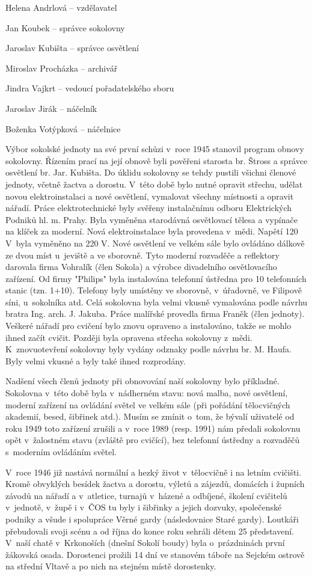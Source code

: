 \documentclass[a5paper, 12pt, twoside]{article}
\begin{document}
Helena Andrlová -- vzdělavatel

Jan Koubek -- správce sokolovny

Jaroslav Kubišta -- správce osvětlení

Miroslav Procházka -- archivář

Jindra Vajkrt -- vedoucí pořadatelského sboru

Jaroslav Jirák -- náčelník

Boženka Votýpková -- náčelnice

Výbor sokolské jednoty na své první schůzi v~roce 1945 stanovil program
obnovy sokolovny. Řízením prací na její obnově byli pověřeni starosta
br. Štross a správce osvětlení br. Jar. Kubišta. Do úklidu sokolovny se
tehdy pustili všichni členové jednoty, včetně žactva a dorostu. V~této
době bylo nutné opravit střechu, udělat novou elektroinstalaci a nové
osvětlení, vymalovat všechny místnosti a opravit nářadí. Práce
elektrotechnické byly svěřeny instalačnímu odboru Elektrických Podniků
hl. m. Prahy. Byla vyměněna starodávná osvětlovací tělesa a vypínače na
klíček za moderní. Nová elektroinstalace byla provedena v~mědi. Napětí
120 V~byla vyměněno na 220 V. Nové osvětlení ve velkém sále bylo
ovládáno dálkově ze dvou míst u~jeviště a ve sborovně. Tyto moderní
rozvaděče a reflektory darovala firma Vohralík (člen Sokola) a výrobce
divadelního osvětlovacího zařízení. Od firmy "Philips" byla instalována
telefonní ústředna pro 10 telefonních stanic (tzn. 1+10). Telefony byly
umístěny ve sborovně, v~úřadovně, ve Filipově síni, u~sokolníka atd.
Celá sokolovna byla velmi vkusně vymalována podle návrhu bratra Ing.
arch. J. Jakuba. Práce malířské provedla firma Franěk (člen jednoty).
Veškeré nářadí pro cvičení bylo znovu opraveno a instalováno, takže se
mohlo ihned začít cvičit. Později byla opravena střecha sokolovny
z~mědi. K~znovuotevření sokolovny byly vydány odznaky podle návrhu br. M.
Haufa. Byly velmi vkusné a byly také ihned rozprodány.

Nadšení všech členů jednoty při obnovování naší sokolovny bylo
příkladné. Sokolovna v~této době byla v~nádherném stavu: nová malba,
nové osvětlení, moderní zařízení na ovládání světel ve velkém sále (při
pořádání tělocvičných akademií, besed, šibřinek atd.). Musím se zmínit
o~tom, že bývalí uživatelé od roku 1949 toto zařízení zrušili a v~roce
1989 (resp. 1991) nám předali sokolovnu opět v~žalostném stavu (zvláště
pro cvičící), bez telefonní ústředny a rozvaděčů s~moderním ovládáním
světel.

V~roce 1946 již nastává normální a hezký život v~tělocvičně i na letním
cvičišti. Kromě obvyklých besídek žactva a dorostu, výletů a zájezdů,
domácích i župních závodů na nářadí a v~atletice, turnajů v~házené a
odbíjené, školení cvičitelů v~jednotě, v~župě i v~ČOS tu byly i šibřinky
a jejich dozvuky, společenské podniky a všude i spolupráce Věrné gardy
(následovnice Staré gardy). Loutkáři přebudovali svoji scénu a od října
do konce roku sehráli dětem 25 představení. V~naší chatě v~Krkonoších
(dnešní Sokolí boudy) byla o~prázdninách první žákovská osada.
Dorostenci prožili 14 dní ve stanovém táboře na Sejckém ostrově na
střední Vltavě a po nich na stejném místě dorostenky.
\end{document}
